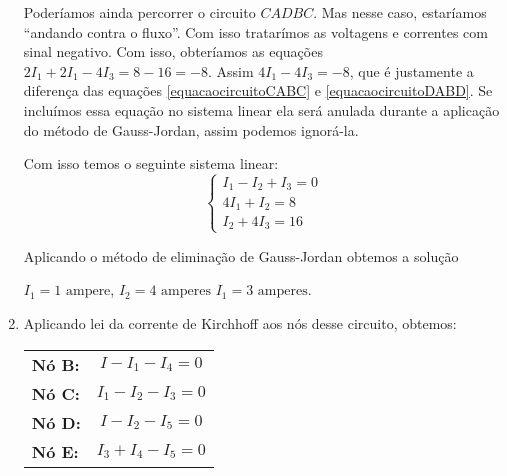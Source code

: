 \begin{exemplos}
\begin{solucao}
\begin{enumerate}
            Poderíamos ainda percorrer o circuito $CADBC$. Mas nesse caso, estaríamos ``andando contra o fluxo''. Com isso tratarímos as voltagens e correntes com sinal negativo. Com isso, obteríamos as equações $2I_1 + 2I_1 - 4I_3 = 8 - 16 = -8$. Assim $4I_1 - 4I_3 = -8$, que é justamente a diferença das equações \eqref{equacaocircuitoCABC} e \eqref{equacaocircuitoDABD}. Se incluímos essa equação no sistema linear ela será anulada durante a aplicação do método de Gauss-Jordan, assim podemos ignorá-la.

            Com isso temos o seguinte sistema linear:
            \[
                \begin{cases}
                    I_1 - I_2 + I_3 = 0\\
                    4I_1 + I_2 = 8\\
                    I_2 + 4I_3 = 16
                \end{cases}
            \]

            Aplicando o método de eliminação de Gauss-Jordan obtemos a solução
            \begin{center}
                $I_1 = 1 \mbox{ ampere}$, $I_2 = 4 \mbox{ amperes}$ $I_1 = 3 \mbox{ amperes}$.
            \end{center}

            \item Aplicando lei da corrente de Kirchhoff aos nós desse circuito, obtemos:
            \begin{center}
                \begin{tabular}{lc}
                    \textbf{Nó B:} & $I - I_1 - I_4 = 0$\\
                    \textbf{Nó C:} & $I_1 - I_2 - I_3 = 0$\\
                    \textbf{Nó D:} & $I - I_2 - I_5 = 0$\\
                    \textbf{Nó E:}& $I_3 + I_4 - I_5 = 0$
                \end{tabular}
            \end{center}


\end{enumerate}
\end{solucao}
\end{exemplos}
